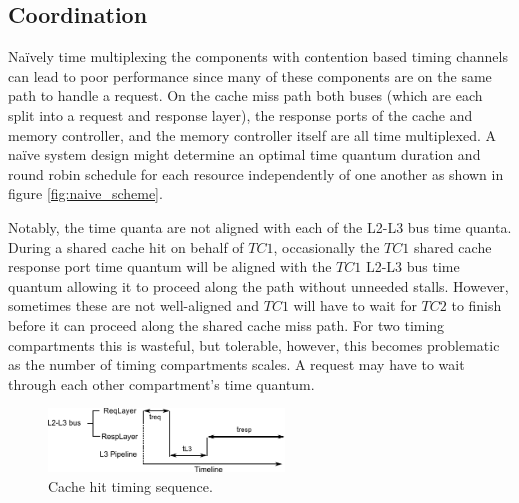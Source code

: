 \subsection{Coordination}
Naïvely time multiplexing the components with contention based timing channels 
can lead to poor performance since many of these components are on the same 
path to handle a request. 
On the cache miss path both buses (which are each split into a request and 
response layer), the response ports of the cache and memory controller, and the 
memory controller itself are all time multiplexed. A naïve system design might 
determine an optimal time quantum duration and round robin schedule for each 
resource independently of one another as shown in figure 
\ref{fig:naive_scheme}.

Notably, the time quanta are not aligned with each of the L2-L3 bus time 
quanta.  During a shared cache hit on behalf of $TC1$, occasionally the $TC1$ 
shared cache response port time quantum will be aligned with the $TC1$ L2-L3 
bus time quantum allowing it to proceed along the path without unneeded stalls.  
However, sometimes these are not well-aligned and $TC1$ will have to wait for 
$TC2$ to finish before it can proceed along the shared cache miss path. For two 
timing compartments this is wasteful, but tolerable, however, this becomes 
problematic as the number of timing compartments scales. A request may have to 
wait through each other compartment's time quantum. 

\begin{figure}
    \begin{center}
        \includegraphics[width=2.4675in]{figs/hit_timing.pdf}
        \caption{Cache hit timing sequence.}
        \label{fig:hit_timing}
    \end{center}
\end{figure}

